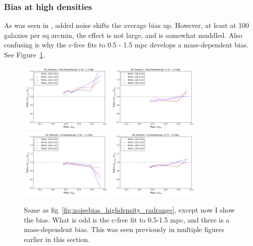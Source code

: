 \documentclass[11pt]{article}
\begin{document}

\subsubsection{Bias at high densities}

As was seen in \citet{bahe12}, added noise shifts the average bias up. However, at least at 100 galaxies per sq arcmin, the effect is not large, and is somewhat muddled. Also confusing is why the c-free fits to 0.5 - 1.5 mpc develops a mass-dependent bias. See Figure~\ref{fig:noisebias_highdensity_bias}.

\begin{figure}
\centering
\includegraphics[width=0.4\textwidth]{figures/noise_cfree-r5-n1_3}
\includegraphics[width=0.4\textwidth]{figures/noise_cfree-r10-n1_3}\\
\includegraphics[width=0.4\textwidth]{figures/noise_c4-r5-n1_3}
\includegraphics[width=0.4\textwidth]{figures/noise_c4-r10-n1_3}
\caption{Same as fig~\ref{fig:noisebias_highdensity_radrange}, except now I show the bias. What is odd is the c-free fit to 0.5-1.5 mpc, and there is a mass-dependent bias. This was seen previously in multiple figures earlier in this section.}
\label{fig:noisebias_highdensity_bias}
\end{figure}
\end{document}
